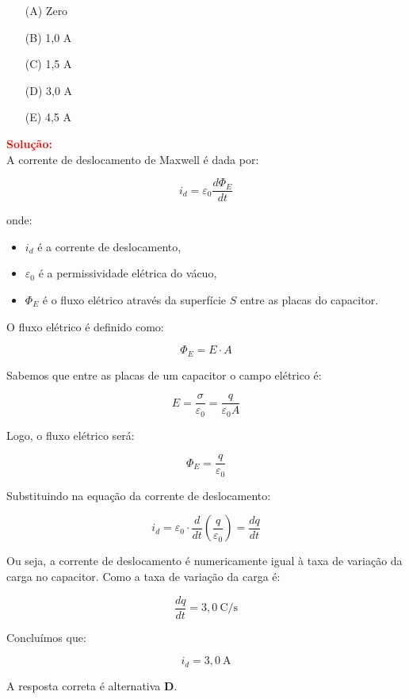 \begin{flushleft}
\begin{itemize}
\item[(A)] Zero
\item[(B)] 1,0 A
\item[(C)] 1,5 A
\item[(D)] 3,0 A
\item[(E)] 4,5 A
\end{itemize}

\vspace{0.5cm}

\textcolor{red}{\textbf{Solução:}}\\

A corrente de deslocamento de Maxwell é dada por: 

\[
i_d = \varepsilon_0 \frac{d\Phi_E}{dt}
\]

onde:
\begin{itemize}
  \item $i_d$ é a corrente de deslocamento,
  \item $\varepsilon_0$ é a permissividade elétrica do vácuo,
  \item $\Phi_E$ é o fluxo elétrico através da superfície $S$ entre as placas do capacitor.
\end{itemize}

O fluxo elétrico é definido como:

\[
\Phi_E = E \cdot A
\]

Sabemos que entre as placas de um capacitor o campo elétrico é:

\[
E = \frac{\sigma}{\varepsilon_0} = \frac{q}{\varepsilon_0 A}
\]

Logo, o fluxo elétrico será:

\[
\Phi_E = \frac{q}{\varepsilon_0}
\]

Substituindo na equação da corrente de deslocamento:

\[
i_d = \varepsilon_0 \cdot \frac{d}{dt} \left( \frac{q}{\varepsilon_0} \right) = \frac{dq}{dt}
\]

Ou seja, a corrente de deslocamento é numericamente igual à taxa de variação da carga no capacitor. Como a taxa de variação da carga é:

\[
\frac{dq}{dt} = 3{,}0 \ \mathrm{C/s}
\]

Concluímos que:

\[
\boxed{i_d = 3{,}0 \ \mathrm{A}}
\]

A resposta correta é alternativa \colorbox{green!50}{\textbf{D}}.
\end{flushleft}

